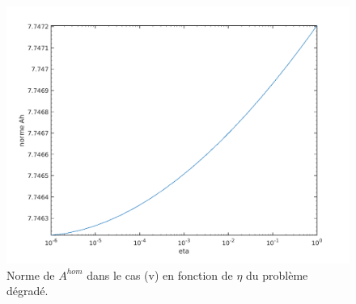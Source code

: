 \documentclass[11pt]{article}
\newcommand{\Ah}{A^{hom}}
\begin{document}
\begin{figure}
  \centering
  \includegraphics[height=.27\textheight]{SolutionPbHomogeneise/Ah_eta}
  \caption{Norme de $\Ah$ dans le cas (v) en fonction de $\eta$ du problème dégradé.}
  \label{fig:Aheta}
\end{figure}
\end{document}
